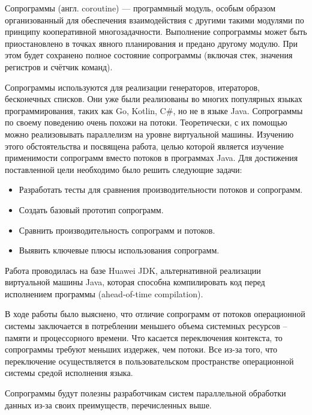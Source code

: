 
Сопрограммы (англ. coroutine) — программный модуль, особым образом организованный для
обеспечения взаимодействия с другими такими модулями по принципу кооперативной
многозадачности\cite{coroutine}. Выполнение сопрограммы может быть
приостановлено в точках явного планирования и предано другому модулю. 
При этом будет сохранено полное состояние сопрограммы (включая стек, значения регистров и счётчик команд). 

\par
Сопрограммы используются для реализации генераторов, итераторов, бесконечных списков. 
Они уже были реализованы во многих популярных языках программирования, таких как Go, Kotlin,
C\#, но не в языке Java. Сопрограммы по своему поведению очень похожи на потоки.
Теоретически, с их помощью можно реализовывать параллелизм на уровне виртуальной машины.
Изучению этого обстоятельства и посвящена работа, целью которой является изучение
применимости сопрограмм вместо потоков в программах Java.
Для достижения поставленной цели необходимо было решить следующие задачи:
\begin{itemize}
	\item Разработать тесты для сравнения производительности потоков и сопрограмм.
	\item Создать базовый прототип сопрограмм.
	\item Сравнить производительность сопрограмм и потоков.
	\item Выявить ключевые плюсы использования сопрограмм.
\end{itemize}
Работа проводилась на базе Huawei JDK, альтернативной реализации виртуальной машины Java, которая способна компилировать код перед исполнением программы (ahead-of-time compilation). 
\par
В ходе работы было выяснено, что отличие сопрограмм от потоков операционной системы
заключается в потреблении меньшего объема системных ресурсов – памяти и процессорного времени.
Что касается переключения контекста, то сопрограммы требуют меньших издержек, чем
потоки. Все из-за того, что переключение осуществляется в пользовательском пространстве
операционной системы средой исполнения языка. 
\par
Сопрограммы будут полезны разработчикам систем параллельной обработки данных из-за своих преимуществ, перечисленных выше.
\clearpage

